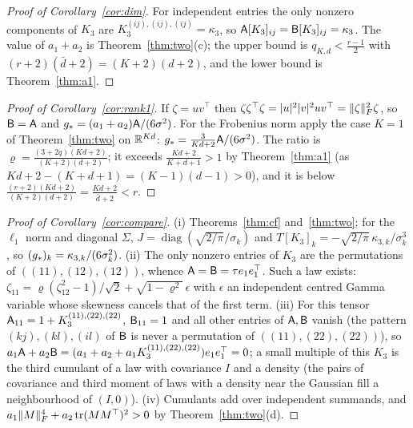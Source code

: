 \begin{proof}[Proof of Corollary~\ref{cor:dim}]
For independent entries the only nonzero components of $K_3$ are $K_3^{(ij),(ij),(ij)}=\kappa_3$, so
$\mathsf{A}[K_3]_{ij}=\mathsf{B}[K_3]_{ij}=\kappa_3$. The value of $a_1+a_2$ is Theorem~\ref{thm:two}(c); the upper bound is
$q_{K,d}<\frac{r-1}2$ with $(r+2)(\bar d+2)=(K+2)(d+2)$, and the lower bound is Theorem~\ref{thm:a1}.
\end{proof}

\begin{proof}[Proof of Corollary~\ref{cor:rank1}]
If $\zeta=uv^\top$ then $\zeta\zeta^\top\zeta=|u|^2|v|^2uv^\top=\|\zeta\|_{F}^2\zeta$, so $\mathsf{B}=\mathsf{A}$ and
$g_\ast=(a_1+a_2)\mathsf{A}/(6\sigma^2)$. For the Frobenius norm apply the case $K=1$ of Theorem~\ref{thm:two} on $\mathbb{R}^{Kd}$:
$g_\ast=\frac3{Kd+2}\mathsf{A}/(6\sigma^2)$. The ratio is $\varrho=\frac{(3+2q)(Kd+2)}{(K+2)(d+2)}$; it exceeds
$\frac{Kd+2}{K+d+1}>1$ by Theorem~\ref{thm:a1} (as $Kd+2-(K+d+1)=(K-1)(d-1)>0$), and it is below
$\frac{(r+2)(Kd+2)}{(K+2)(d+2)}=\frac{Kd+2}{\bar d+2}<r$.
\end{proof}

\begin{proof}[Proof of Corollary~\ref{cor:compare}]
(i) Theorems~\ref{thm:cf} and~\ref{thm:two}; for the $\ell_1$ norm and diagonal $\Sigma$,
$J=\operatorname{diag}(\sqrt{2/\pi}/\sigma_k)$ and $T[K_3]_k=-\sqrt{2/\pi}\,\kappa_{3,k}/\sigma_k^3$, so
$(g_\ast)_k=\kappa_{3,k}/(6\sigma_k^2)$. (ii) The only nonzero entries of $K_3$ are the permutations of
$((11),(12),(12))$, whence $\mathsf{A}=\mathsf{B}=\tau e_1e_1^\top$. Such a law exists:
$\zeta_{11}=\varrho(\zeta_{12}^2-1)/\sqrt2+\sqrt{1-\varrho^2}\,\epsilon$ with $\epsilon$ an independent centred Gamma
variable whose skewness cancels that of the first term. (iii) For this tensor
$\mathsf{A}_{11}=1+K_3^{(11),(22),(22)}$, $\mathsf{B}_{11}=1$ and all other entries of $\mathsf{A},\mathsf{B}$ vanish (the pattern
$(kj),(kl),(il)$ of $\mathsf{B}$ is never a permutation of $((11),(22),(22))$), so
$a_1\mathsf{A}+a_2\mathsf{B}=(a_1+a_2+a_1K_3^{(11),(22),(22)})e_1e_1^\top=0$; a small multiple of this $K_3$ is the third cumulant of a law
with covariance $I$ and a density (the pairs of covariance and third moment of laws with a density near the Gaussian
fill a neighbourhood of $(I,0)$). (iv) Cumulants add over independent summands, and
$a_1\|M\|_{F}^4+a_2\operatorname{tr}(MM^\top)^2>0$ by Theorem~\ref{thm:two}(d).
\end{proof}
